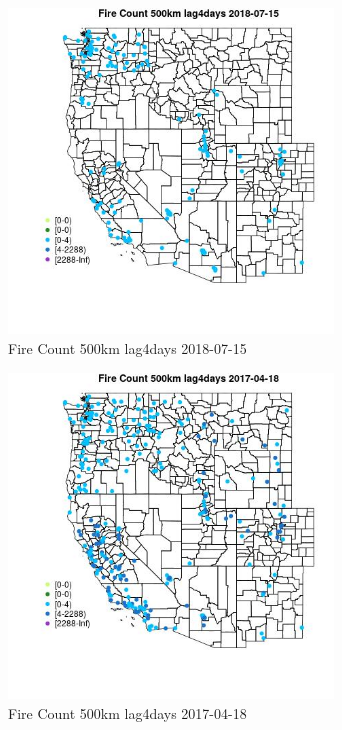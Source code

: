 \begin{figure} 
\centering  
\includegraphics[width=0.77\textwidth]{Code_Outputs/Report_ML_input_PM25_Step4_part_e_de_duplicated_aves_compiled_2019-05-20wNAs_MapObsFire_Count_500km_lag4days2018-07-15.jpg} 
\caption{\label{fig:Report_ML_input_PM25_Step4_part_e_de_duplicated_aves_compiled_2019-05-20wNAsMapObsFire_Count_500km_lag4days2018-07-15}Fire Count 500km lag4days 2018-07-15} 
\end{figure} 
 

\begin{figure} 
\centering  
\includegraphics[width=0.77\textwidth]{Code_Outputs/Report_ML_input_PM25_Step4_part_e_de_duplicated_aves_compiled_2019-05-20wNAs_MapObsFire_Count_500km_lag4days2017-04-18.jpg} 
\caption{\label{fig:Report_ML_input_PM25_Step4_part_e_de_duplicated_aves_compiled_2019-05-20wNAsMapObsFire_Count_500km_lag4days2017-04-18}Fire Count 500km lag4days 2017-04-18} 
\end{figure} 
 

